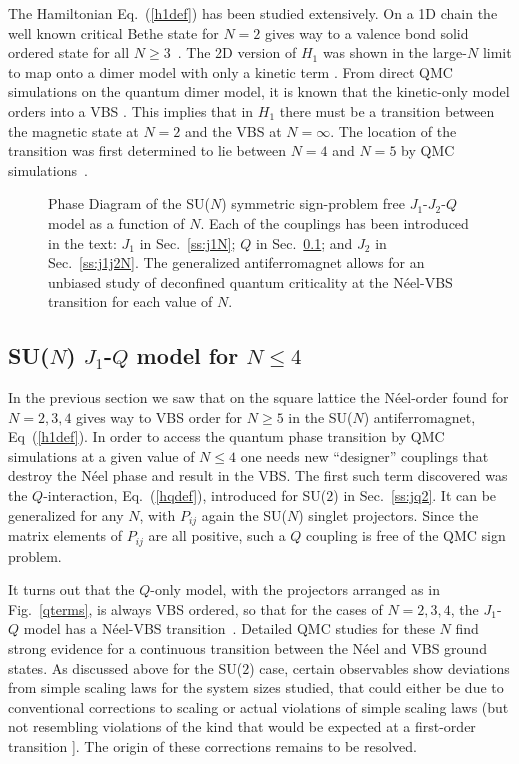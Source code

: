 \documentclass[range]{ar2e}
\begin{document}
The Hamiltonian Eq.~(\ref{h1def})
has been studied extensively. On a 1D chain the well known critical Bethe state for $N=2$ gives way to a 
valence bond solid ordered state for all $N\geq 3$~\cite{barber1989:d1n3_vbs,klumper1989:d1n3_vbs,affleck1985:lgN}. The 2D version of $H_{1}$ was shown 
in the large-$N$ limit to map onto a dimer model with only a kinetic term \cite{read1989:nucphysB}. From direct QMC simulations on the quantum dimer model, 
it is known that the kinetic-only model orders into a VBS \cite{sachdev1989:qd_vbs}.  This implies that in $H_{1}$ there must be a transition between the 
magnetic state at $N=2$ and the VBS at $N=\infty$.  The location of the transition was first determined to lie between $N=4$ and $N=5$ 
by QMC simulations~\cite{harada2003:sun}.


\begin{figure}
\centerline{}
  \caption{ \label{fig:pdj1j2q} Phase Diagram of the
    SU($N$) symmetric sign-problem free
    $J_1$-$J_2$-$Q$ model as a function of $N$. Each of the couplings has been introduced
    in the text: $J_1$ in Sec.~\ref{ss:j1N}; $Q$ in Sec.~\ref{ss:jqN};
  and $J_2$ in Sec.~\ref{ss:j1j2N}. The generalized antiferromagnet
  allows for an unbiased study of deconfined quantum
  criticality at the N\'eel-VBS transition for each value of $N$. }
\end{figure}


\subsection{SU($N$) $J_1$-$Q$ model for $N\leq 4$}
\label{ss:jqN}
In the previous section we saw that on the square lattice the N\'eel-order found for $N=2,3,4$ gives way to VBS
order for $N\geq 5$ in the SU($N$) antiferromagnet, Eq~(\ref{h1def}). In order to access the quantum phase transition by QMC simulations at a 
given value of $N\leq 4$ one needs new ``designer'' couplings that destroy the N\'eel phase and result in the VBS. The first such term discovered 
was the $Q$-interaction, Eq.~(\ref{hqdef}), introduced for SU($2$) in Sec.~\ref{ss:jq2}. It can be generalized for any $N$, with $P_{ij}$ again 
the SU($N$) singlet projectors. Since the matrix elements of $P_{ij}$ are all positive, such a $Q$ coupling is free of the QMC sign problem. 

It turns out that the $Q$-only model, with the projectors arranged as in Fig.~\ref{qterms}, is always VBS ordered, so that for the cases of $N=2,3,4$, 
the $J_1$-$Q$ model has a N\'eel-VBS transition~\cite{Sandvik07,lou2009:sun}. Detailed QMC studies for these $N$ find strong evidence for a 
continuous transition between the N\'eel and VBS ground states\cite{melko2008:jq,kaul2011:su34,banerjee2010:log,banerjee2010:su3}. 
As discussed above for the SU($2$) case, certain observables show deviations from simple scaling laws for the system sizes studied, that could either 
be due to conventional corrections to scaling or actual violations of simple scaling laws (but not resembling violations of the kind that would be 
expected at a first-order transition \cite{Sandvik10c}]. The origin of these corrections remains to be resolved.
\end{document}
